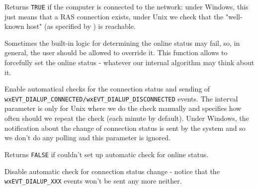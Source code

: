 \label{wxdialupmanagerisonline}


Returns {\tt TRUE} if the computer is connected to the network: under Windows,
this just means that a RAS connection exists, under Unix we check that
the "well-known host" (as specified by 
) is reachable.

\label{wxdialupmanagersetonlinestatus}


Sometimes the built-in logic for determining the online status may fail,
so, in general, the user should be allowed to override it. This function
allows to forcefully set the online status - whatever our internal
algorithm may think about it.



\label{wxdialupmanagerenableautocheckonlinestatus}


Enable automatical checks for the connection status and sending of 
{\tt wxEVT\_DIALUP\_CONNECTED/wxEVT\_DIALUP\_DISCONNECTED} events. The interval
parameter is only for Unix where we do the check manually and specifies how
often should we repeat the check (each minute by default). Under Windows, the
notification about the change of connection status is sent by the system and so
we don't do any polling and this parameter is ignored.

Returns {\tt FALSE} if couldn't set up automatic check for online status.

\label{wxdialupmanagerdisableautocheckonlinestatus}


Disable automatic check for connection status change - notice that the
{\tt wxEVT\_DIALUP\_XXX} events won't be sent any more neither.

\label{wxdialupmanagersetwellknownhost}



